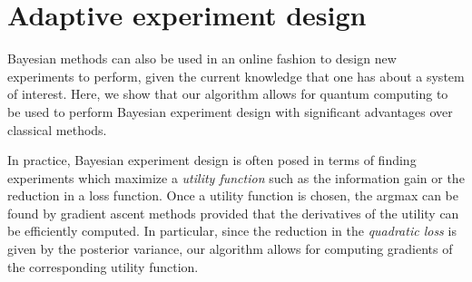 \documentclass[aps,amsmath,onecolumn,amssymb]{revtex4}
\begin{document}
\section{Adaptive experiment design}

Bayesian methods can also be used in an online fashion to design new
experiments to perform, given the current knowledge that one has about a
system of interest. Here, we show that our algorithm allows for quantum
computing to be used to perform Bayesian experiment design with significant
advantages over classical methods.

In practice, Bayesian experiment design is often posed in terms of finding
experiments which maximize a \emph{utility function} such as the information
gain or the reduction in a loss function. Once a utility function is
chosen, the argmax can be found by gradient ascent methods provided that the
derivatives of the utility can be efficiently computed. In particular, since
the reduction in the \emph{quadratic loss} is given by the posterior variance,
our algorithm allows for computing gradients of the corresponding utility
function.

\end{document}
